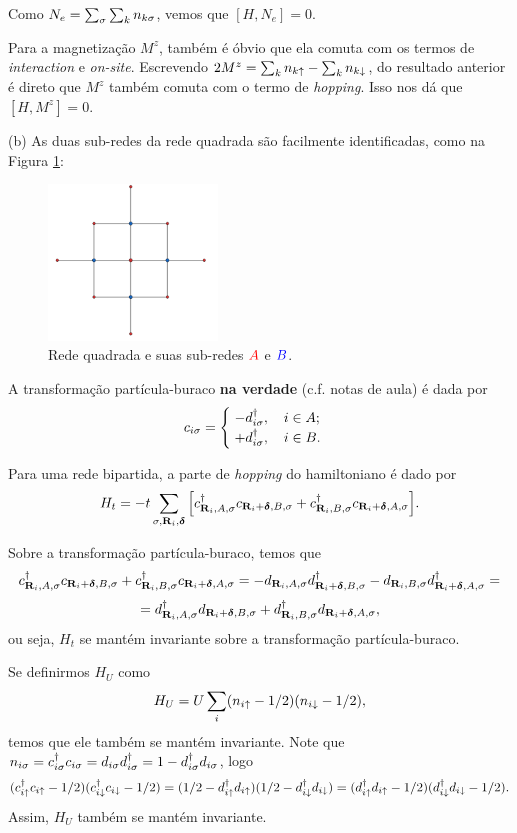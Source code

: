 \documentclass[a4paper,10pt]{article}
\begin{document}
Como $N_e = \sum_{\sigma} \sum_{k} n_{k\sigma}$, vemos que $[H, N_e] = 0$.

\n

Para a magnetização $M^z$, também é óbvio que ela comuta com os termos de \textit{interaction} e \textit{on-site}. Escrevendo $2 M^z = \sum_{k} n_{k\uparrow} - \sum_{k} n_{k\downarrow}$, do resultado anterior é direto que $M^z$ também comuta com o termo de \textit{hopping}. Isso nos dá que $[H, M^z] = 0$.

\pagebreak

(b) As duas sub-redes da rede quadrada são facilmente identificadas, como na Figura \ref{fig:square-lat}:
\begin{figure}[H]
\centering
\includegraphics[width=0.4\textwidth]{fig/square-lat.png}
\caption{Rede quadrada e suas sub-redes $\textcolor{red}{A}$ e $\textcolor{blue}{B}$.}
\label{fig:square-lat}
\end{figure}


A transformação partícula-buraco \textbf{na verdade} (c.f. notas de aula) é dada por
$$
c_{i\sigma} =
\begin{cases}
\; -d_{i\sigma}^\dagger, \quad i \in A; \\
\; +d_{i\sigma}^\dagger, \quad i \in B.
\end{cases}
$$

Para uma rede bipartida, a parte de \textit{hopping} do hamiltoniano é dado por
$$
H_t = -t \sum_{\sigma, \vb{R}_i, \bm{\delta}} \Big[
c_{\vb{R}_i, A, \sigma}^\dagger c_{\vb{R}_i + \bm{\delta}, B, \sigma} +
c_{\vb{R}_i, B, \sigma}^\dagger c_{\vb{R}_i + \bm{\delta}, A, \sigma}
\Big].
$$

Sobre a transformação partícula-buraco, temos que
$$
c_{\vb{R}_i, A, \sigma}^\dagger c_{\vb{R}_i + \bm{\delta}, B, \sigma} +
c_{\vb{R}_i, B, \sigma}^\dagger c_{\vb{R}_i + \bm{\delta}, A, \sigma} =
- d_{\vb{R}_i, A, \sigma} d_{\vb{R}_i + \bm{\delta}, B, \sigma}^\dagger
- d_{\vb{R}_i, B, \sigma} d_{\vb{R}_i + \bm{\delta}, A, \sigma}^\dagger =
$$
$$
= d_{\vb{R}_i, A, \sigma}^\dagger d_{\vb{R}_i + \bm{\delta}, B, \sigma} +
d_{\vb{R}_i, B, \sigma}^\dagger d_{\vb{R}_i + \bm{\delta}, A, \sigma},
$$
ou seja, $H_t$ se mantém invariante sobre a transformação partícula-buraco.

Se definirmos $H_U$ como
$$
H_U = U \sum_{i} (n_{i\uparrow} - 1/2) (n_{i\downarrow} - 1/2),
$$
temos que ele também se mantém invariante. Note que $n_{i\sigma} = c_{i\sigma}^\dagger c_{i\sigma} = d_{i\sigma} d_{i\sigma}^\dagger = 1 - d_{i\sigma}^\dagger d_{i\sigma}$, logo
$$
(c_{i\uparrow}^\dagger c_{i\uparrow} - 1/2) (c_{i\downarrow}^\dagger c_{i\downarrow} - 1/2) =
(1/2 - d_{i\uparrow}^\dagger d_{i\uparrow}) (1/2 - d_{i\downarrow}^\dagger d_{i\downarrow}) =
(d_{i\uparrow}^\dagger d_{i\uparrow} - 1/2) (d_{i\downarrow}^\dagger d_{i\downarrow} - 1/2).
$$
Assim, $H_U$ também se mantém invariante.
\end{document}
